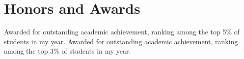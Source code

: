 \section{Honors and Awards}
{Awarded for outstanding academic achievement, ranking among the top 5\% of students in my year.}
{Awarded for outstanding academic achievement, ranking among the top 3\% of students in my year.}
